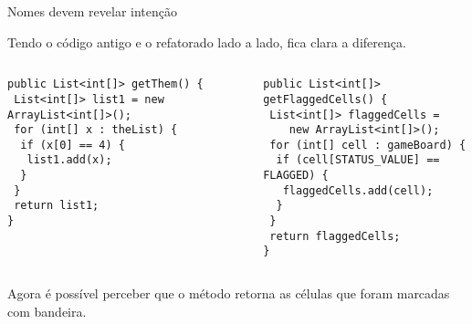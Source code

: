 \documentclass[11pt]{beamer}
\begin{document}
  \begin{frame}[fragile]{Nomes devem revelar intenção}

    Tendo o código antigo e o refatorado lado a lado, fica clara a diferença.
  
    \begin{columns}
      \begin{column}{0.48\textwidth}
        \begin{lstlisting}[basicstyle=\tiny]
public List<int[]> getThem() {
 List<int[]> list1 = new ArrayList<int[]>();
 for (int[] x : theList) {
  if (x[0] == 4) {
   list1.add(x);
  }
 }
 return list1;
}
        \end{lstlisting}
      \end{column}
      \begin{column}{0.48\textwidth}
        \begin{lstlisting}[basicstyle=\tiny]
public List<int[]> getFlaggedCells() {
 List<int[]> flaggedCells = 
    new ArrayList<int[]>();
 for (int[] cell : gameBoard) {
  if (cell[STATUS_VALUE] == FLAGGED) {
   flaggedCells.add(cell);
  }
 }
 return flaggedCells;
}
        \end{lstlisting}
      \end{column}
    \end{columns}

    Agora é possível perceber que o método retorna as células que foram marcadas com bandeira.
  \end{frame}
  
\end{document}
